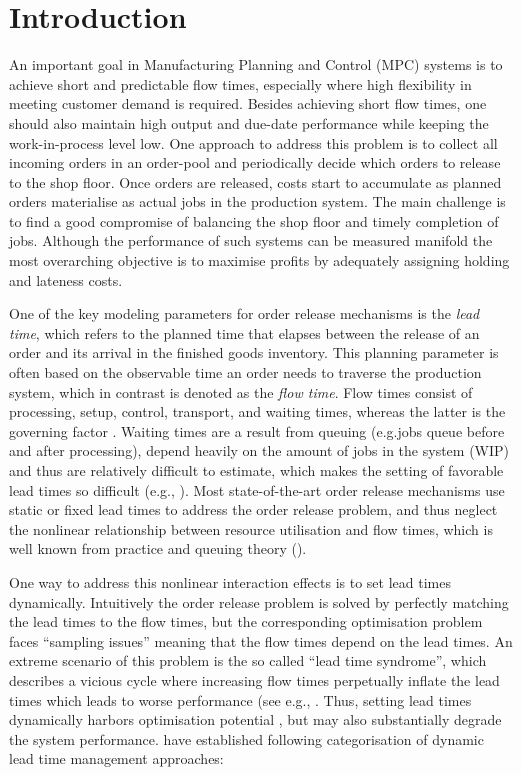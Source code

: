 \documentclass[envcountsame]{llncs}
\begin{document}
\section{Introduction}\label{sec:introduction}
An important goal in Manufacturing Planning and Control (MPC) systems is to achieve short and
predictable flow times, especially where high flexibility in meeting customer demand is required.
Besides achieving short flow times, one should also maintain high output and due-date performance
while keeping the work-in-process level low. One approach to address this problem is to collect all
incoming orders in an order-pool and periodically decide which orders to release to the shop floor.
Once orders are released, costs start to accumulate as planned orders materialise as actual jobs in
the production system. The main challenge is to find a good compromise of balancing the shop floor
and timely completion of jobs. Although the performance of such systems can be measured manifold the
most overarching objective is to maximise profits by adequately assigning holding and lateness
costs.

One of the key modeling parameters for order release mechanisms is the \textit{lead time}, which
refers to the planned time that elapses between the release of an order and its arrival in the
finished goods inventory. This planning parameter is often based on the observable time an order
needs to traverse the production system, which in contrast is denoted as the \textit{flow time}.
Flow times consist of processing, setup, control, transport, and waiting times, whereas the latter
is the governing factor \citep[][p.223]{zapfel1982produktionswirtschaft}. Waiting times are a result
from queuing (e.g.\@ jobs queue before and after processing), depend heavily on the amount of jobs in
the system (WIP) and thus are relatively difficult to estimate, which makes the
setting of favorable lead times so difficult (e.g., \citealt{Tatsiopoulos1983, Wiendahl1995}). Most
state-of-the-art order release mechanisms use static or fixed lead times to address the order
release problem, and thus neglect the nonlinear relationship between resource utilisation and flow
times, which is well known from practice and queuing theory (\citealt{Pahl2007}).

One way to address this nonlinear interaction effects is to set lead times dynamically. Intuitively
the order release problem is solved by perfectly matching the lead times to the flow times, but the
corresponding optimisation problem faces ``sampling issues'' meaning that the flow times depend on
the lead times. An extreme scenario of this problem is the so called ``lead time syndrome'', which
describes a vicious cycle where increasing flow times perpetually inflate the lead times which leads
to worse performance (see e.g., \citealt{Mather1978, knollmann2013control, Selcuk2006}.
%
Thus, setting lead times dynamically harbors optimisation potential \citep{hoyt1978dynamic}, but may
also substantially degrade the system performance.
%
\citet{schneckenreither2020order} have established
following categorisation of dynamic lead time management approaches:
\end{document}
